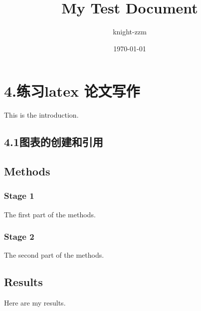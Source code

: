 \documentclass[a4paper,12pt]{report}
\begin{document}
\title{My Test Document}
\author{knight-zzm}
\date{\today}
\maketitle

\chapter*{4.练习latex 论文写作}
This is the introduction.

\section*{4.1图表的创建和引用}
\section{Methods}

\subsection{Stage 1}
The first part of the methods.

\subsection{Stage 2}
The second part of the methods.

\section{Results}
Here are my results.
\end{document}
